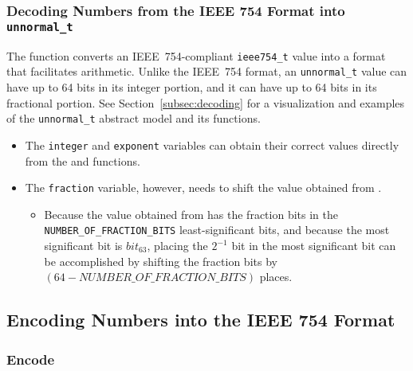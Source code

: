 \subsubsection{Decoding Numbers from the IEEE 754 Format into \texttt{unnormal\_t}}

The  function converts an IEEE~754-compliant \lstinline{ieee754_t} value into a format that facilitates arithmetic.
Unlike the IEEE~754 format, an \lstinline{unnormal_t} value can have up to 64 bits in its integer portion, and it can have up to 64 bits in its fractional portion.
See Section~\ref{subsec:decoding} for a visualization and examples of the \lstinline{unnormal_t} abstract model and its functions.

\begin{description}
    \begin{itemize}
        \item The \lstinline{integer} and \lstinline{exponent} variables can obtain their correct values directly from the  and  functions.
        \item The \lstinline{fraction} variable, however, needs to shift the value obtained from .
        \begin{itemize}
            \item Because the value obtained from  has the fraction bits in the \lstinline{NUMBER_OF_FRACTION_BITS} least-significant bits,
            and because the most significant bit is $bit_{63}$, placing the $2^{-1}$ bit in the most significant bit can be accomplished by shifting the fraction bits by $(64 - NUMBER\_OF\_FRACTION\_BITS)$ places.
        \end{itemize}
    \end{itemize}
\end{description}



\subsection{Encoding Numbers into the IEEE 754 Format}

\subsubsection*{Encode}

